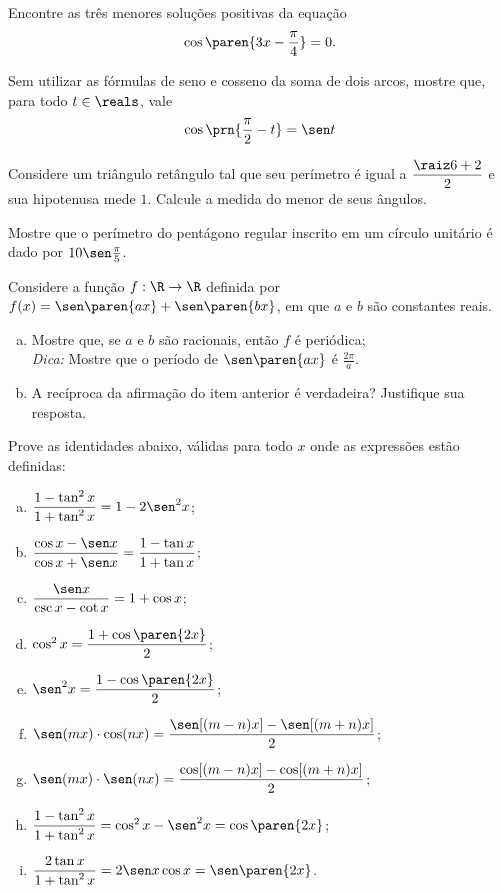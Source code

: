 \begin{exercise}
    Encontre as três menores soluções positivas da equação $$\cos
\paren{3x - \frac {\pi} 4} = 0.$$
\end{exercise}

\begin{exercise}
  Sem utilizar as fórmulas de seno e cosseno da soma de dois arcos,
  mostre que, para todo $t\in\reals$, vale \[\cos\prn{\frac \pi 2-t}=\sen t\]
\end{exercise}

\begin{exercise}
  Considere um triângulo retângulo tal que seu perímetro é igual a $\dfrac{\raiz 6 + 2}{2}$ e sua hipotenusa mede $1$. Calcule a medida do menor de seus ângulos.
\end{exercise}

\begin{exercise}
    Mostre que o perímetro do pentágono regular inscrito em um
círculo unitário é dado por $10\sen \frac {\pi} 5$.
\end{exercise}

\begin{exercise}
    Considere a função $f: \R \to \R$ definida por $f(x) = \sen
\paren{ax}+\sen \paren{bx}$, em que $a$ e $b$ são constantes reais.
\begin{enumerate}[a)]
  \item Mostre que, se $a$ e $b$ são racionais, então $f$ é
  periódica;\\
  \emph{Dica:} Mostre que o período de $\sen \paren{ax}$ é $\frac
  {2\pi} a$.
  \item A recíproca da afirmação do item anterior é verdadeira?
  Justifique sua resposta.
\end{enumerate}
\end{exercise}

\begin{exercise}
    Prove as identidades abaixo, válidas para todo $x$ onde as
expressões estão definidas:
\begin{enumerate}[a)]
  \item $\dfrac{1-\tan^2 x}{1+\tan^2 x} = 1 - 2\sen^2 x$;
  \item $\dfrac{\cos x - \sen x}{\cos x + \sen x} = \dfrac{1 - \tan x}{1+\tan
  x}$;
  \item $\dfrac{\sen x}{\csc x - \cot x} = 1+ \cos x$;
  \item $\cos^2 x = \dfrac {1+\cos \paren{2x}} 2$;
  \item $\sen^2 x = \dfrac {1-\cos \paren{2x}} 2$;
  \item $\sen(mx)\cdot\cos(nx)=\dfrac{\sen[(m-n)x]-\sen[(m+n)x]}{2}$;
  \item $\sen(mx)\cdot\sen(nx)=\dfrac{\cos[(m-n)x]-\cos[(m+n)x]}{2}$;
  \item $\dfrac{1-\tan^2 x}{1+\tan^2 x} = \cos^2 x - \sen^2 x = \cos \paren{2x}$;
  \item $\dfrac{2\tan x}{1+\tan^2 x} = 2\sen x \cos x= \sen\paren{2x}$.
\end{enumerate}
\end{exercise}

